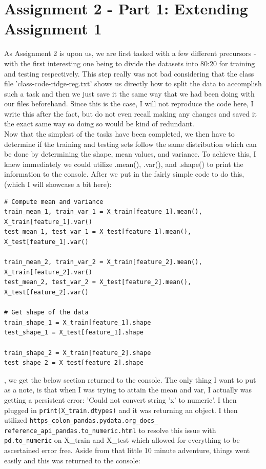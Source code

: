 \documentclass[conference]{IEEEtran} %
\begin{document}
\section{Assignment 2 - Part 1: Extending Assignment 1}
As Assignment 2 is upon us, we are first tasked with a few different precursors - with the first interesting one being to divide the datasets into 80:20 for training and testing respectively.  This step really was not bad considering that the class file 'class-code-ridge-reg.txt' shows us directly how to split the data to accomplish such a task and then we just save it the same way that we had been doing with our files beforehand.  Since this is the case, I will not reproduce the code here, I write this after the fact, but do not even recall making any changes and saved it the exact same way so doing so would be kind of redundant. \\
Now that the simplest of the tasks have been completed, we then have to determine if the training and testing sets follow the same distribution which can be done by determining the shape, mean values, and variance.  To achieve this, I knew immediately we could utilize .mean(), .var(), and .shape() to print the information to the console.  After we put in the fairly simple code to do this, (which I will showcase a bit here):
\begin{lstlisting}
# Compute mean and variance
train_mean_1, train_var_1 = X_train[feature_1].mean(), X_train[feature_1].var()
test_mean_1, test_var_1 = X_test[feature_1].mean(), X_test[feature_1].var()

train_mean_2, train_var_2 = X_train[feature_2].mean(), X_train[feature_2].var()
test_mean_2, test_var_2 = X_test[feature_2].mean(), X_test[feature_2].var()

# Get shape of the data
train_shape_1 = X_train[feature_1].shape
test_shape_1 = X_test[feature_1].shape

train_shape_2 = X_train[feature_2].shape
test_shape_2 = X_test[feature_2].shape
\end{lstlisting}

, we get the below section returned to the console.  The only thing I want to put as a note, is that when I was trying to attain the mean and var, I actually was getting a persistent error: 'Could not convert string '{x}' to numeric'.  I then plugged in \texttt{print(X\_train.dtypes)}
and it was returning an object. I then utilized \texttt{https\_colon\_pandas.pydata.org\_docs\_\\reference\_api\_pandas.to\_numeric.html} to resolve this issue with \texttt{pd.to\_numeric} on X\_train and X\_test which allowed for everything to be ascertained error free. Aside from that little 10 minute adventure, things went easily and this was returned to the console:
\end{document}
